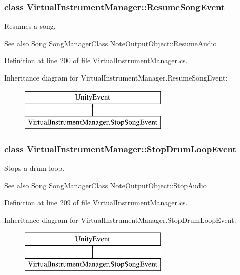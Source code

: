\subsubsection{class Virtual\+Instrument\+Manager\+:\+:Resume\+Song\+Event}
Resumes a song. 

\begin{DoxySeeAlso}{See also}
\hyperlink{class_song}{Song} \hyperlink{class_song_manager_class}{Song\+Manager\+Class} \hyperlink{group___n_o_o_pub_func_ga2df8edec357dd4123146c9a7e8485ffb}{Note\+Output\+Object\+::\+Resume\+Audio} 
\end{DoxySeeAlso}


Definition at line 200 of file Virtual\+Instrument\+Manager.\+cs.

Inheritance diagram for Virtual\+Instrument\+Manager.\+Resume\+Song\+Event\+:\begin{figure}[H]
\begin{center}
\leavevmode
\includegraphics[height=2.000000cm]{group___v_i_m_event_types}
\end{center}
\end{figure}
\label{class_virtual_instrument_manager_1_1_stop_drum_loop_event}
\subsubsection{class Virtual\+Instrument\+Manager\+:\+:Stop\+Drum\+Loop\+Event}
Stops a drum loop. 

\begin{DoxySeeAlso}{See also}
\hyperlink{class_song}{Song} \hyperlink{class_song_manager_class}{Song\+Manager\+Class} \hyperlink{group___n_o_o_pub_func_gae8a8e5bc027fd0186464a68399a4fecb}{Note\+Output\+Object\+::\+Stop\+Audio} 
\end{DoxySeeAlso}


Definition at line 209 of file Virtual\+Instrument\+Manager.\+cs.

Inheritance diagram for Virtual\+Instrument\+Manager.\+Stop\+Drum\+Loop\+Event\+:\begin{figure}[H]
\begin{center}
\leavevmode
\includegraphics[height=2.000000cm]{group___v_i_m_event_types}
\end{center}
\end{figure}
\label{class_virtual_instrument_manager_1_1_stop_song_event}

